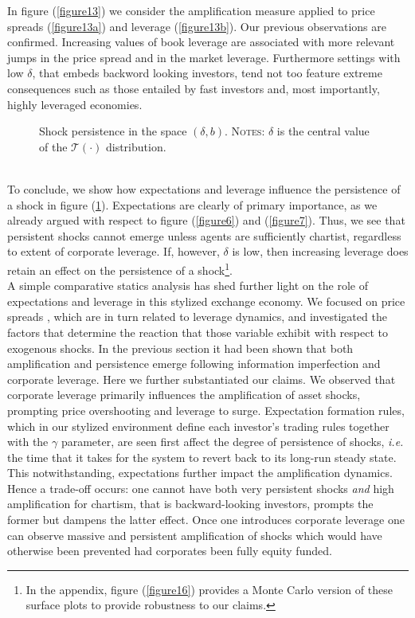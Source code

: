 \documentclass[11pt]{article}
\begin{document}
In figure (\ref{figure13}) we consider the amplification measure applied to price spreads (\ref{figure13a}) and leverage (\ref{figure13b}). Our previous observations are confirmed. Increasing values of book leverage are associated with more relevant jumps in the price spread and in the market leverage. Furthermore settings with low $\delta$, that embeds backword looking investors, tend not too feature extreme consequences such as those entailed by fast investors and, most importantly, highly leveraged economies.
\begin{figure}[h!]
\centering
{}\quad
{}
 \caption{Shock persistence in the space $(\delta,b)$. \textsc{Notes}: $\delta$ is the central value of the $\mathcal{T}(\cdot)$ distribution.} \label{figure14}
\end{figure}\\
To conclude, we show how expectations and leverage influence the persistence of a shock in figure (\ref{figure14}). Expectations are clearly of primary importance, as we already argued with respect to figure (\ref{figure6}) and (\ref{figure7}). Thus, we see that persistent shocks cannot emerge unless agents are sufficiently chartist, regardless to extent of corporate leverage. If, however, $\delta$ is low, then increasing leverage does retain an effect on the persistence of a shock\footnote{In the appendix, figure (\ref{figure16}) provides a Monte Carlo version of these surface plots to provide robustness to our claims.}.\\
A simple comparative statics analysis has shed further light on the role of expectations and leverage in this stylized exchange economy. We focused on price spreads , which are in turn related to leverage dynamics, and investigated the factors that determine the reaction that those variable exhibit with respect to exogenous shocks. In the previous section it had been shown that both amplification and persistence emerge following information imperfection and corporate leverage. Here we further substantiated our claims. We observed that corporate leverage primarily influences the amplification of asset shocks, prompting price overshooting and leverage to surge. Expectation formation rules, which in our stylized environment define each investor's trading rules together with the $\gamma$ parameter, are seen first affect the degree of persistence of shocks, \emph{i.e.} the time that it takes for the system to revert back to its long-run steady state. This notwithstanding, expectations further impact the amplification dynamics. Hence a trade-off occurs: one cannot have both very persistent shocks \emph{and} high amplification for chartism, that is backward-looking investors, prompts the former but dampens the latter effect. Once one introduces corporate leverage one can observe massive and persistent amplification of shocks which would have otherwise been prevented had corporates been fully equity funded.
\end{document}
